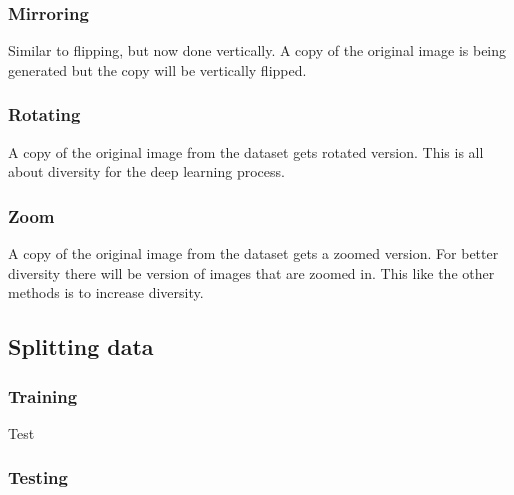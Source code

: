 \subsubsection{Mirroring}
Similar to flipping, but now done vertically. 
A copy of the original image is being generated but the copy will be vertically flipped.
\subsubsection{Rotating}
A copy of the original image from the dataset gets rotated version.
This is all about diversity for the deep learning process.  
\subsubsection{Zoom}
A copy of the original image from the dataset gets a zoomed version.
For better diversity there will be version of images that are zoomed in. 
This like the other methods is to increase diversity.

\subsection{Splitting data}

\subsubsection{Training}
Test

\subsubsection{Testing}



